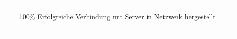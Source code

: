 \begin{scriptsize}
\begin{center}
\begin{tabularx}{\textwidth}{|p{2.2cm}|X|}
{\begin{minipage}{.78\textwidth}
\begin{flushleft}
\begin{itemize} [leftmargin=7mm]
         \item [100\%] Erfolgreiche Verbindung mit Server in Netzwerk hergestellt
    \end{itemize}
    \end{flushleft}
    \end{minipage}} \\
    & & & \\
    & & & \\
    \hline
\end{tabularx}
\end{center}
\endgroup
\end{scriptsize}
\newpage

